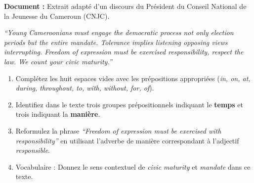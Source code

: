 \documentclass[11pt]{article}
\begin{document}
\begin{exercice}
\textbf{Document :} Extrait adapté d'un discours du Président du Conseil National de la Jeunesse du Cameroun (CNJC).

\textit{``Young Cameroonians must engage \underline{\hspace{1.5cm}} the democratic process not only \underline{\hspace{1.5cm}} election periods but \underline{\hspace{1.5cm}} the entire mandate. Tolerance implies listening \underline{\hspace{1.5cm}} opposing views \underline{\hspace{1.5cm}} interrupting. Freedom of expression must be exercised \underline{\hspace{1.5cm}} responsibility, \underline{\hspace{1.5cm}} respect \underline{\hspace{1.5cm}} the law. We count \underline{\hspace{1.5cm}} your civic maturity.''}

\begin{enumerate}
\item Complétez les huit espaces vides avec les prépositions appropriées (\textit{in, on, at, during, throughout, to, with, without, for, of}).
\item Identifiez dans le texte trois groupes prépositionnels indiquant le \textbf{temps} et trois indiquant la \textbf{manière}.
\item Reformulez la phrase \textit{``Freedom of expression must be exercised with responsibility''} en utilisant l'adverbe de manière correspondant à l'adjectif \textit{responsible}.
\item Vocabulaire : Donnez le sens contextuel de \textit{civic maturity} et \textit{mandate} dans ce texte.
\end{enumerate}
\end{exercice}
\end{document}

